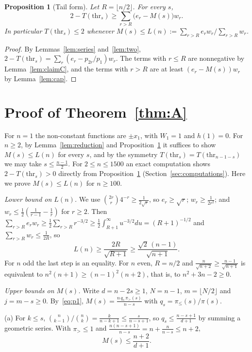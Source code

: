 \documentclass[11pt]{amsart}
\newtheorem{proposition}[lemma]{Proposition}
\theoremstyle{remark}
\newcommand{\thr}{\mathrm{thr}}
\begin{document}
\begin{proposition}[Tail form]\label{prop:tail}
Let $R=\lfloor n/2\rfloor$. For every $s$,
\[
 2-T(\thr_s)\ge\sum_{r>R}\bigl(e_r-M(s)\bigr)w_r.
\]
In particular $T(\thr_s)\le2$ whenever $M(s)\le L(n):=\sum_{r>R}e_rw_r\big/\sum_{r>R}w_r$.
\end{proposition}

\begin{proof}
By Lemmas~\ref{lem:series} and~\ref{lem:two}, $2-T(\thr_s)=\sum_r(e_r-p_{2r}/p_1)w_r$. The terms with $r\le R$ are nonnegative by Lemma~\ref{lem:claimC}, and the terms with $r>R$ are at least $(e_r-M(s))w_r$ by Lemma~\ref{lem:cap}.
\end{proof}

\section{Proof of Theorem~\ref{thm:A}}\label{sec:A}

For $n=1$ the non-constant functions are $\pm x_1$, with $W_1=1$ and $h(1)=0$. For $n\ge2$, by Lemma~\ref{lem:reduction} and Proposition~\ref{prop:tail} it suffices to show $M(s)\le L(n)$ for every $s$, and by the symmetry $T(\thr_s)=T(\thr_{n-1-s})$ we may take $s\le\frac{n-1}2$. For $2\le n\le1500$ an exact computation shows $2-T(\thr_s)>0$ directly from Proposition~\ref{prop:tail} (Section~\ref{sec:computations}). Here we prove $M(s)\le L(n)$ for $n\ge100$.

\emph{Lower bound on $L(n)$.} We use $\binom{2r}r4^{-r}\ge\frac1{2\sqrt r}$, so $e_r\ge\sqrt r$; $w_r\ge\frac1{2r^2}$; and $w_r\le\frac12(\frac1{r-1}-\frac1r)$ for $r\ge2$. Then $\sum_{r>R}e_rw_r\ge\frac12\sum_{r>R}r^{-3/2}\ge\frac12\int_{R+1}^\infty u^{-3/2}du=(R+1)^{-1/2}$ and $\sum_{r>R}w_r\le\frac1{2R}$, so
\[
 L(n)\ge\frac{2R}{\sqrt{R+1}}\ge\frac{\sqrt2\,(n-1)}{\sqrt{n+1}}.
\]
For $n$ odd the last step is an equality. For $n$ even, $R=n/2$ and $\frac n{\sqrt{n+2}}\ge\frac{n-1}{\sqrt{n+1}}$ is equivalent to $n^2(n+1)\ge(n-1)^2(n+2)$, that is, to $n^2+3n-2\ge0$.

\emph{Upper bounds on $M(s)$.} Write $d=n-2s\ge1$, $N=n-1$, $m=\lfloor N/2\rfloor$ and $j=m-s\ge0$. By~\eqref{eq:p1}, $M(s)=\frac{n\,q_s\,\pi_>(s)}{n-s}$ with $q_s=\pi_\le(s)/\pi(s)$.

(a) For $k\le s$, $\binom n{k-1}\big/\binom nk=\frac k{n-k+1}\le\frac s{n-s+1}$, so $q_s\le\frac{n-s+1}{d+1}$ by summing a geometric series. With $\pi_>\le1$ and $\frac{n(n-s+1)}{n-s}=n+\frac n{n-s}\le n+2$,
\[
 M(s)\le\frac{n+2}{d+1}.
\]
\end{document}
